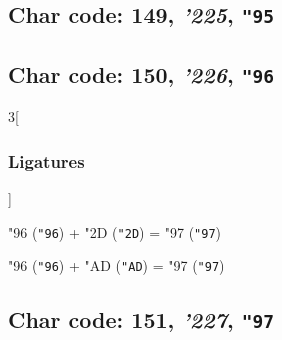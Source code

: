 \documentclass{article}
\newlength{\maxcharwidth}
\begin{document}
\subsection{Char code: 149, {\it'225}, {\tt"95}}
\label{char_149}


\subsection{Char code: 150, {\it'226}, {\tt"96}}
\label{char_150}


\begin{multicols}{3}[\subsubsection{Ligatures}]

{\testfont\char"96\noboundary} ({\tt"96}) + {\testfont\char"2D\noboundary} ({\tt"2D}) = {\testfont\char"97\noboundary} ({\tt"97}) 

{\testfont\char"96\noboundary} ({\tt"96}) + {\testfont\char"AD\noboundary} ({\tt"AD}) = {\testfont\char"97\noboundary} ({\tt"97}) 

\end{multicols}

\subsection{Char code: 151, {\it'227}, {\tt"97}}
\label{char_151}

\end{document}
